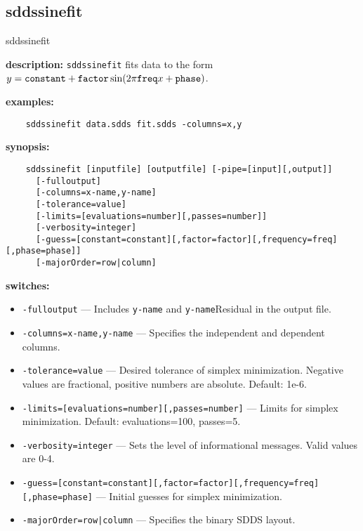\newpage
\subsection{sddssinefit}
\label{sddssinefit}

\begin{sddsprog}{sddssinefit}
  \item \textbf{description:} \verb|sddssinefit| fits data to the form
    $y = \verb|constant| + \verb|factor| \sin(2\pi \verb|freq| x + \verb|phase|)$.
  \item \textbf{examples:}
    \begin{verbatim}
    sddssinefit data.sdds fit.sdds -columns=x,y
    \end{verbatim}
  \item \textbf{synopsis:}
    \begin{verbatim}
    sddssinefit [inputfile] [outputfile] [-pipe=[input][,output]]
      [-fulloutput]
      [-columns=x-name,y-name]
      [-tolerance=value]
      [-limits=[evaluations=number][,passes=number]]
      [-verbosity=integer]
      [-guess=[constant=constant][,factor=factor][,frequency=freq][,phase=phase]]
      [-majorOrder=row|column]
    \end{verbatim}
  \item \textbf{switches:}
    \begin{itemize}
      \item \verb|-fulloutput| --- Includes \verb|y-name| and \verb|y-name|Residual in the output file.
      \item \verb|-columns=x-name,y-name| --- Specifies the independent and dependent columns.
      \item \verb|-tolerance=value| --- Desired tolerance of simplex minimization. Negative values are fractional,
        positive numbers are absolute. Default: 1e-6.
      \item \verb|-limits=[evaluations=number][,passes=number]| --- Limits for simplex minimization.
        Default: evaluations=100, passes=5.
      \item \verb|-verbosity=integer| --- Sets the level of informational messages. Valid values are 0-4.
      \item \verb|-guess=[constant=constant][,factor=factor][,frequency=freq][,phase=phase]| --- Initial guesses for
        simplex minimization.
      \item \verb!-majorOrder=row|column! --- Specifies the binary SDDS layout.

\end{itemize}
\end{sddsprog}
